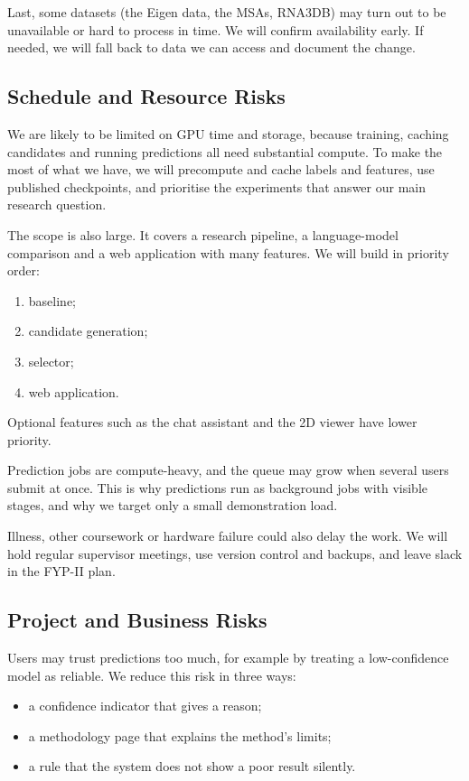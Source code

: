 \documentclass{FastFyp}
\begin{document}
Last, some datasets (the Eigen data, the MSAs, RNA3DB) may turn out to be unavailable or hard to process in time. We will confirm availability early. If needed, we will fall back to data we can access and document the change.

\subsection{Schedule and Resource Risks}
We are likely to be limited on GPU time and storage, because training, caching candidates and running predictions all need substantial compute. To make the most of what we have, we will precompute and cache labels and features, use published checkpoints, and prioritise the experiments that answer our main research question.

The scope is also large. It covers a research pipeline, a language-model comparison and a web application with many features. We will build in priority order:
\begin{enumerate}
\item baseline;
\item candidate generation;
\item selector;
\item web application.
\end{enumerate}
Optional features such as the chat assistant and the 2D viewer have lower priority.

Prediction jobs are compute-heavy, and the queue may grow when several users submit at once. This is why predictions run as background jobs with visible stages, and why we target only a small demonstration load.

Illness, other coursework or hardware failure could also delay the work. We will hold regular supervisor meetings, use version control and backups, and leave slack in the FYP-II plan.

\subsection{Project and Business Risks}
Users may trust predictions too much, for example by treating a low-confidence model as reliable. We reduce this risk in three ways:
\begin{itemize}
\item a confidence indicator that gives a reason;
\item a methodology page that explains the method's limits;
\item a rule that the system does not show a poor result silently.
\end{itemize}
\end{document}
